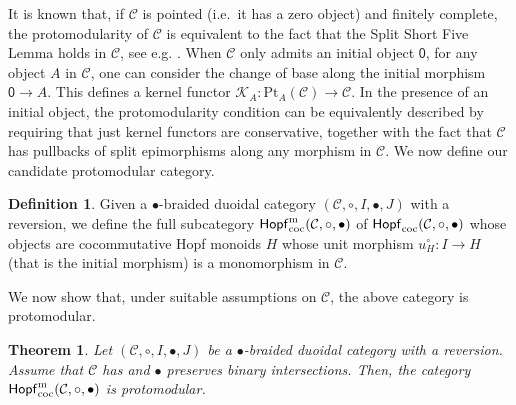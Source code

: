 \documentclass[nosumlimits,twoside]{amsart}
\newtheorem{theorem}{\sc Theorem}[section]
\newtheorem{lemma}[lemma]{\sc Lemma}
\theoremstyle{definition}
\newtheorem{definition}[definition]{\sc Definition}
\theoremstyle{remark}
\newcommand{\rd}[1]{{\color{red}{#1}}}
\newcommand{\Cc}{\mathcal{C}}
\newcommand{\Mm}{\mathcal{M}}
\def\cHopfmon{{\sf Hopf}_{\mathrm{coc}}}
\def\initial{\mathsf{0}}
\begin{document}
It is known that, if $\Cc$ is pointed (i.e.\ it has
a zero object) and finitely complete, the protomodularity of $\Cc$ is equivalent to the fact that the Split Short Five Lemma holds in $\Cc$, see e.g. \cite[Proposition 3.1.2]{BB04}. When $\Cc$ only admits an initial object $\initial$, for any object $A$ in $\Cc$, one can consider the change of base along the initial morphism $\initial\to A$. This defines a kernel functor $\mathcal{K}_{A}:\mathrm{Pt}_{A}(\Cc)\to\Cc$. In the presence of an initial object, the protomodularity condition can be equivalently described  by requiring that just kernel functors are conservative, together with the fact that $\Cc$ has pullbacks of split epimorphisms along any morphism in $\Cc$. \medskip\newline
We now define our candidate protomodular category.

\begin{definition}
 Given a $\bullet$-braided duoidal category $\left( \mathcal{C},\circ ,I,\bullet ,J\right) $ with a reversion, we define the full subcategory $\cHopfmon^{\mathrm{m}}(\Cc,\circ, \bullet )$ of $\cHopfmon(\Cc,\circ,\bullet)$ whose objects are cocommutative Hopf monoids $H$ whose unit morphism $u_{H}^{\circ}:I\to H$ (that is the initial morphism) is a  monomorphism in $\Cc$.
\end{definition}

We now show that, under suitable assumptions on $\Cc$, the above category is protomodular.


\begin{theorem}
\label{thm:protomon}
  Let $\left( \mathcal{C},\circ ,I,\bullet ,J\right) $ be a $\bullet $-braided duoidal category with a reversion.  Assume that $\mathcal{C}$ has and $\bullet$ preserves binary intersections. Then, the category $\cHopfmon^{\mathrm{m}}(\Cc,\circ, \bullet )$ is protomodular.
\end{theorem}
\end{document}
